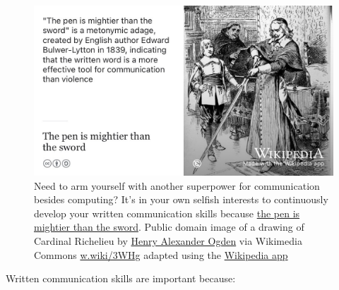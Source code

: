 \documentclass[
]{book}
\begin{document}
\begin{figure}

{\centering \includegraphics[width=1\linewidth]{images/the-pen-is-mightier-than-the-sword} 

}

\caption{Need to arm yourself with another superpower for communication besides computing? It's in your own selfish interests to continuously develop your written communication skills because \href{https://en.wikipedia.org/wiki/The_pen_is_mightier_than_the_sword}{the pen is mightier than the sword}. Public domain image of a drawing of Cardinal Richelieu by \href{https://en.wikipedia.org/wiki/Henry_Alexander_Ogden}{Henry Alexander Ogden} via Wikimedia Commons \href{https://w.wiki/3WHg}{w.wiki/3WHg} adapted using the \href{https://apps.apple.com/us/app/wikipedia/id324715238}{Wikipedia app}}\label{fig:mighty-pen-fig}
\end{figure}



Written communication skills are important because:
\end{document}
